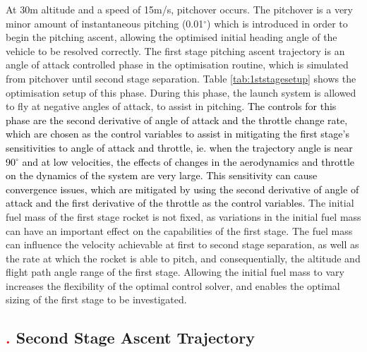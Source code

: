 At 30m altitude and a speed of 15m/s, pitchover occurs. The pitchover is a very minor amount of instantaneous pitching (0.01$^\circ$) which is introduced in order to begin the pitching ascent, allowing the optimised initial heading angle of the vehicle to be resolved correctly. 
The first stage pitching ascent trajectory is an angle of attack controlled phase in the optimisation routine, which is simulated from pitchover until second stage separation. Table \ref{tab:1ststagesetup} shows the optimisation setup of this phase. During this phase, the launch system is allowed to fly at negative angles of attack, to assist in pitching. \textcolor{black}{ The controls for this phase are the second derivative of angle of attack and the throttle change rate, which are chosen as the control variables to assist in mitigating the first stage's sensitivities to angle of attack and throttle, ie. when the trajectory angle is near 90$^\circ$ and at low velocities, the effects of changes in the aerodynamics and throttle on the dynamics of the system are very large. This sensitivity can cause convergence issues, which are mitigated by using the second derivative of angle of attack and the first derivative of the throttle as the control variables. }
The initial fuel mass of the first stage rocket is not fixed, as variations in the initial fuel mass can have an important effect on the capabilities of the first stage. The fuel mass can influence the velocity achievable at first to second stage separation, as well as the rate at which the rocket is able to pitch, and consequentially, the altitude and flight path angle range of the first stage.
Allowing the initial fuel mass to vary increases the flexibility of the optimal control solver, and enables the optimal sizing of the first stage to be investigated. 



\subsection{\textcolor{red}{.} Second Stage Ascent Trajectory}


